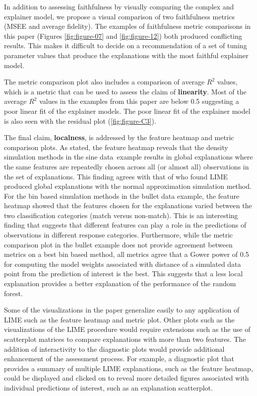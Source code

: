 \documentclass[AMS,STIX2COL]{WileyNJD-v2}\usepackage[]{graphicx}\usepackage[]{color}
\newcommand{\data}{sine data}
\begin{document}
In addition to assessing faithfulness by visually comparing the complex and explainer model, we propose a visual comparison of two faithfulness metrics (MSEE and average fidelity). The examples of faithfulness metric comparisons in this paper (Figures \ref{fig:figure-07} and \ref{fig:figure-12}) both produced conflicting results. This makes it difficult to decide on a recommendation of a set of tuning parameter values that produce the explanations with the most faithful explainer model.

The metric comparison plot also includes a comparison of average $R^2$ values, which is a metric that can be used to assess the claim of \textbf{linearity}. Most of the average $R^2$ values in the examples from this paper are below 0.5 suggesting a poor linear fit of the explainer models. The poor linear fit of the explainer model is also seen with the residual plot (\autoref{fig:figure-C3}).

The final claim, \textbf{localness}, is addressed by the feature heatmap and metric comparison plots. As stated, the feature heatmap reveals that the density simulation methods in the \data \ example  results in global explanations where the same features are repeatedly chosen across all (or almost all) observations in the set of explanations. This finding agrees with that of \citet{laugel:2018} who found LIME produced global explanations with the normal approximation simulation method. For the bin based simulation methods in the bullet data example, the feature heatmap showed that the features chosen for the explanations varied between the two classification categories (match versus non-match). This is an interesting finding that suggests that different features can play a role in the predictions of observations in different response categories. Furthermore, while the metric comparison plot in the bullet example does not provide agreement between metrics on a best bin based method, all metrics agree that a Gower power of 0.5 for computing the model weights associated with distance of a simulated data point from the prediction of interest is the best. This suggests that a less local explanation provides a better explanation of the performance of the random forest.

Some of the visualizations in the paper generalize easily to any application of LIME such as the feature heatmap and metric plot. Other plots such as the visualizations of the LIME procedure would require extensions such as the use of scatterplot matrices to compare explanations with more than two features. The addition of interactivity to the diagnostic plots would provide additional enhancement of the assessment process. For example, a diagnostic plot that provides a summary of multiple LIME explanations, such as the feature heatmap, could be displayed and clicked on to reveal more detailed figures associated with individual predictions of interest, such as an explanation scatterplot.
\end{document}
